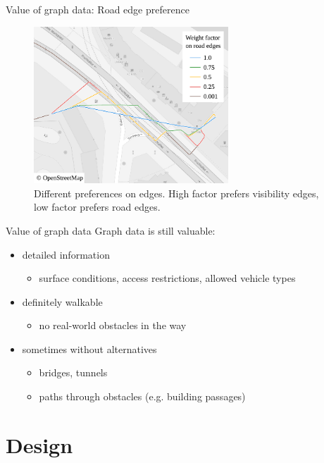 \documentclass[xcolor={x11names}]{beamer}
\renewcommand{\n}{\hfill\\[0.5ex]}
\newenvironment{figcenter}
{%
	\parskip=0pt%
	\par%
	\nopagebreak%
	\centering%
}%
{%
	\par%
	\noindent%
	\ignorespacesafterend%
}
\begin{document}
		\begin{frame}{Value of graph data: Road edge preference}
			\begin{figure}[t]
				\begin{figcenter}
					\includegraphics[width=0.65\textwidth]{images/qgis-routing-city-weights.pdf}
				\end{figcenter}
				\caption{Different preferences on edges. High factor prefers visibility edges, low factor prefers road edges.}
			\end{figure}
		\end{frame}
		
		\begin{frame}{Value of graph data}
			Graph data is still valuable:\n
			\begin{itemize}
				\item detailed information
				\begin{itemize}
					\item surface conditions, access restrictions, allowed vehicle types
				\end{itemize}
				\item definitely walkable
				\begin{itemize}
					\item no real-world obstacles in the way
				\end{itemize}
				\item sometimes without alternatives
				\begin{itemize}
					\item bridges, tunnels
					\item paths through obstacles (e.g. building passages)
				\end{itemize}
			\end{itemize}
		\end{frame}
	
	\section{Design}
	
\end{document}

